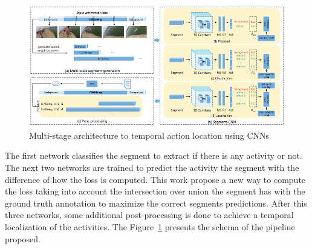 \begin{figure}[ht]
\begin{center}
\includegraphics[width=0.8\linewidth]{img/stateofart/multistage}
\end{center}
\caption{Multi-stage architecture to temporal action location using CNNs}
\label{fig:multistage}
\end{figure}

The first network classifies the segment to extract if there is any activity or not. The next two networks are trained to predict the activity the segment with the difference of how the loss is computed. This work propose a new way to compute the loss taking into account the intersection over union the segment has with the ground truth annotation to maximize the correct segments predictions. After this three networks, some additional post-processing is done to achieve a temporal localization of the activities. The Figure~\ref{fig:multistage} presents the schema of the pipeline proposed.




